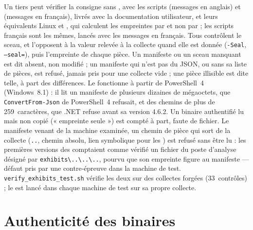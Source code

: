 \documentclass[11pt,a4paper,oneside]{report}
\begin{document}
Un tiers peut vérifier la consigne sans \wac{}, avec les scripts
 (messages en anglais) et
 (messages en français), livrés avec la
documentation utilisateur, et leurs équivalents Linux
 et , qui calculent
les empreintes par  et non par \wac{} ; les scripts
français sont les mêmes, lancés avec les messages en français. Tous contrôlent
le sceau, et l'opposent à la valeur relevée à la collecte quand elle est
donnée (\texttt{-Seal}, \texttt{--seal=}), puis l'empreinte de chaque pièce.
Un manifeste ou un sceau manquant est dit absent, non modifié ; un manifeste
qui n'est pas du JSON, ou sans sa liste de pièces, est refusé, jamais pris
pour une collecte vide ; une pièce illisible est dite telle, à part des
différences. Le  fonctionne à partir de PowerShell~4
(Windows~8.1) : il lit un manifeste de plusieurs dizaines de mégaoctets, que
\texttt{ConvertFrom-Json} de PowerShell~4 refusait, et des chemins de plus de
259~caractères, que .NET refuse avant sa version 4.6.2. Un binaire authentifié lu mais non
copié (« empreinte seule ») est compté à part, faute de fichier. Le manifeste
venant de la machine examinée, un chemin de pièce qui sort de la collecte
(\texttt{..}, chemin absolu, lien symbolique pour les ) est
refusé sans être lu : les premières versions des  comptaient
comme vérifié un fichier du poste d'analyse désigné par
\texttt{exhibits\textbackslash..\textbackslash..\textbackslash..}, pourvu
que son empreinte figure au manifeste — défaut pris par une contre-épreuve
dans la machine de test. \texttt{verify\_exhibits\_test.sh} vérifie les deux
 sur des collectes forgées (33~contrôles) ; le 
est lancé dans chaque machine de test sur sa propre collecte.

\section{Authenticité des binaires}
\end{document}
